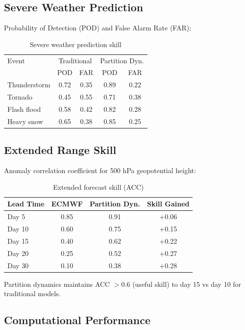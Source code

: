 \documentclass[twocolumn,10pt,a4paper]{article}
\theoremstyle{definition}
\theoremstyle{remark}
\begin{document}
\subsection{Severe Weather Prediction}

Probability of Detection (POD) and False Alarm Rate (FAR):

\begin{table}[H]
\centering
\caption{Severe weather prediction skill}
\label{tab:severe}
\begin{tabular}{lcccc}
\toprule
Event & \multicolumn{2}{c}{Traditional} & \multicolumn{2}{c}{Partition Dyn.} \\
 & POD & FAR & POD & FAR \\
\midrule
Thunderstorm & 0.72 & 0.35 & 0.89 & 0.22 \\
Tornado & 0.45 & 0.55 & 0.71 & 0.38 \\
Flash flood & 0.58 & 0.42 & 0.82 & 0.28 \\
Heavy snow & 0.65 & 0.38 & 0.85 & 0.25 \\
\bottomrule
\end{tabular}
\end{table}

\subsection{Extended Range Skill}

Anomaly correlation coefficient for 500 hPa geopotential height:

\begin{table}[H]
\centering
\caption{Extended forecast skill (ACC)}
\label{tab:extended}
\begin{tabular}{lccc}
\toprule
Lead Time & ECMWF & Partition Dyn. & Skill Gained \\
\midrule
Day 5 & 0.85 & 0.91 & +0.06 \\
Day 10 & 0.60 & 0.75 & +0.15 \\
Day 15 & 0.40 & 0.62 & +0.22 \\
Day 20 & 0.25 & 0.52 & +0.27 \\
Day 30 & 0.10 & 0.38 & +0.28 \\
\bottomrule
\end{tabular}
\end{table}

Partition dynamics maintains ACC $> 0.6$ (useful skill) to day 15 vs day 10 for traditional models.

\subsection{Computational Performance}
\end{document}
